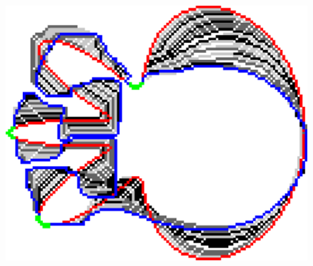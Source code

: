 \begin{figure}[h!]
{\includegraphics[scale=0.25]{figures/chapter5/sqc/fixed-points/flower-2/summary.pdf}
}\\
\hspace{0.25em}%
\subfloat[\label{fig:fixed-c}]{
}
\end{figure}
